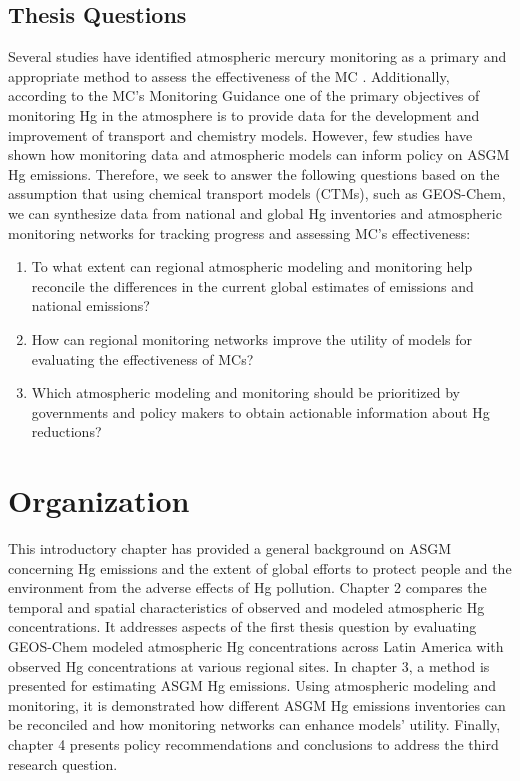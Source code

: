 \begin{flushleft}

 \section{Thesis Questions}
 Several studies have identified atmospheric mercury monitoring as a primary and appropriate method to assess the effectiveness of the MC \cite{sprovieri_atmospheric_2016,evers_evaluating_2016,gustin_measuring_2015,united_nations_environment_programme_technical_2019}. Additionally, according to the MC's Monitoring Guidance one of the primary objectives of monitoring Hg in the atmosphere is to provide data for the development and improvement of transport and chemistry models\cite{unep_guidance_2021}. However, few studies have shown how monitoring data and atmospheric models can inform policy on ASGM Hg emissions. Therefore, we seek to answer the following questions based on the assumption that using chemical transport models (CTMs), such as GEOS-Chem, we can synthesize data from national and global Hg inventories and atmospheric monitoring networks for tracking progress and assessing MC's effectiveness:
\begin{enumerate}
  \item To what extent can regional atmospheric modeling and monitoring help reconcile the differences in the current global estimates of emissions and national emissions?
  \item How can regional monitoring networks improve the utility of models for evaluating the effectiveness of MCs?
  \item Which atmospheric modeling and monitoring should be prioritized by governments and policy makers to obtain actionable information about Hg reductions?
\end{enumerate}
\end{flushleft}

 
\section{Organization}
 
\begin{flushleft}
  This introductory chapter has provided a general background on ASGM concerning Hg emissions and the extent of global efforts to protect people and the environment from the adverse effects of Hg pollution. Chapter 2 compares the temporal and spatial characteristics of observed and modeled atmospheric Hg concentrations. It addresses aspects  of the first thesis question by evaluating GEOS-Chem modeled atmospheric Hg concentrations across Latin America with observed Hg concentrations at various regional sites. In chapter 3, a method is presented for estimating ASGM Hg emissions. Using atmospheric modeling and monitoring, it is demonstrated how different ASGM Hg emissions inventories can be reconciled and how monitoring networks can enhance models' utility. Finally, chapter 4 presents policy recommendations and conclusions to address the third research question.
\end{flushleft}



